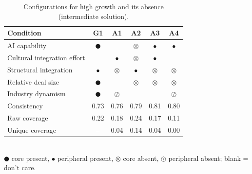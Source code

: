 \begin{table}[htbp]\centering
\caption{Configurations for high growth and its absence (intermediate solution).}
\begin{tabular}{lccccc}
\toprule
Condition & G1 & A1 & A2 & A3 & A4 \\
\midrule
AI capability & $\CIRCLE$ &  & $\otimes$ & $\bullet$ & $\bullet$ \\
Cultural integration effort &  & $\bullet$ & $\otimes$ & $\bullet$ &  \\
Structural integration & $\bullet$ & $\otimes$ & $\bullet$ & $\otimes$ & $\otimes$ \\
Relative deal size & $\CIRCLE$ &  & $\otimes$ & $\otimes$ & $\otimes$ \\
Industry dynamism & $\CIRCLE$ & $\oslash$ &  &  & $\oslash$ \\
\midrule
Consistency & 0.73 & 0.76 & 0.79 & 0.81 & 0.80 \\
Raw coverage & 0.22 & 0.18 & 0.24 & 0.17 & 0.11 \\
Unique coverage & -- & 0.04 & 0.14 & 0.04 & 0.00 \\
\bottomrule
\end{tabular}
\\[2pt]\footnotesize $\CIRCLE$ core present, $\bullet$ peripheral present, $\otimes$ core absent, $\oslash$ peripheral absent; blank = don't care.
\end{table}
